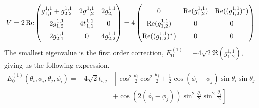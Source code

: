 \begin{equation}
    V = 2\Re
\begingroup
\renewcommand*{\arraystretch}{1.5}
\begin{pmatrix}
    g_{1,1}^{1,1} + g_{2, 2}^{1, 1} & 2 g_{1, 2}^{1, 1} & 2g_{2, 1}^{1, 1}\\
    2 g_{1, 2}^{1, 1} & 4t_{1, 1}^{1, 1} & 0 \\
    2g_{2, 1}^{1, 1} & 0 & 4g_{2,2}^{1, 1}
\end{pmatrix}
\endgroup
= 4
\begingroup
\renewcommand*{\arraystretch}{1.5}
\begin{pmatrix}
    0 & \Re(g_{1, 2}^{1, 1}) & \Re((g_{1, 2}^{1, 1})^*)\\
    \Re(g_{1, 2}^{1, 1}) & 0 & 0 \\
    \Re((g_{1, 2}^{1, 1})^*) & 0 & 0
\end{pmatrix}
\endgroup
\end{equation}
The smallest eigenvalue is the first order correction, $E_0^{(1)}=-4\sqrt{2}\Re(g_{1, 2}^{1, 1})$, giving us the following expression.
\begin{align}
E_0^{(1)}(\theta_i, \phi_i, \theta_j, \phi_i) = -4\sqrt{2}t_{i, j}&\left [ \cos^2\frac{\theta_i}{2}\cos^2\frac{\theta_j}{2} + \frac{1}{2}\cos(\phi_i - \phi_j)\sin\theta_i \sin\theta_j \right . \nonumber\\
&\left .+ \cos(2(\phi_i - \phi_j))\sin^2\frac{\theta_i}{2}\sin^2\frac{\theta_j}{2}\right ]    
\end{align}

